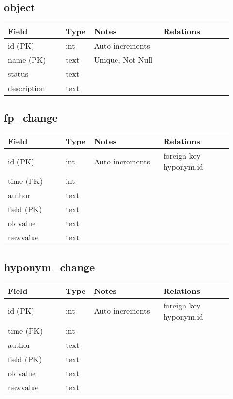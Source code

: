 \documentclass{article}
\begin{document}
\subsection{object}

{\footnotesize
\begin{centering}
\begin{tabular}{p{0.25\linewidth}p{0.07\linewidth}p{0.3\linewidth}p{0.3\linewidth}}
\textbf{Field} & \textbf{Type} & \textbf{Notes} & \textbf{Relations} \\
\hline
id (PK) & int & Auto-increments &  \\
\hline
name (PK) & text & Unique, Not Null & \\
\hline
status & text & & \\
\hline
description & text & & \\
\hline
\end{tabular}
\end{centering}
}



\subsection{fp\_change}

{\footnotesize
\begin{centering}
\begin{tabular}{p{0.25\linewidth}p{0.07\linewidth}p{0.3\linewidth}p{0.3\linewidth}}
\textbf{Field} & \textbf{Type} & \textbf{Notes} & \textbf{Relations} \\
\hline
id (PK) & int & Auto-increments & foreign key hyponym.id \\
\hline
time (PK) & int & & \\
\hline
author & text & & \\
\hline
field  (PK) & text & & \\
\hline
oldvalue & text & & \\
\hline
newvalue & text & & \\
\hline
\end{tabular}
\end{centering}
}

\subsection{hyponym\_change}

{\footnotesize
\begin{centering}
\begin{tabular}{p{0.25\linewidth}p{0.07\linewidth}p{0.3\linewidth}p{0.3\linewidth}}
\textbf{Field} & \textbf{Type} & \textbf{Notes} & \textbf{Relations} \\
\hline
id (PK) & int & Auto-increments & foreign key hyponym.id \\
\hline
time (PK) & int & & \\
\hline
author & text & & \\
\hline
field  (PK) & text & & \\
\hline
oldvalue & text & & \\
\hline
newvalue & text & & \\
\hline
\end{tabular}
\end{centering}
}
\end{document}
